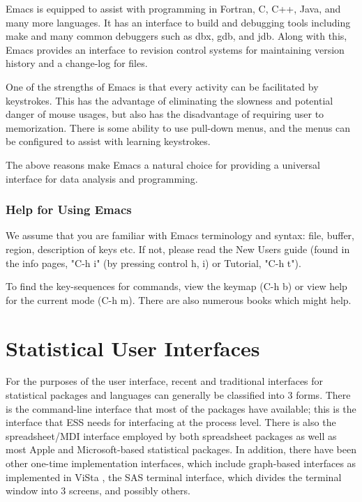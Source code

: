 \documentclass{article}
\begin{document}
Emacs is equipped to assist with programming in Fortran, C, C++, Java,
and many more languages.  It has an interface to build and debugging
tools including make and many common debuggers such as dbx, gdb, and
jdb.   Along with this, Emacs provides an interface to revision control
systems for maintaining version history and a change-log for files.

One of the strengths of Emacs is that every activity can be
facilitated by keystrokes.  This has the advantage of eliminating the
slowness and potential danger of mouse usages, but also has the
disadvantage of requiring user to memorization.  There is some
ability to use pull-down menus, and the menus can be configured to
assist with learning keystrokes.

The above reasons make Emacs a natural choice for providing a
universal interface for data analysis and programming.

\subsubsection{Help for Using Emacs}

We assume that you are familiar with Emacs terminology and syntax:
file, buffer, region, description of keys etc.  If not, please read
the New Users guide (found in the info pages, "C-h i" (by pressing
control h, i) or Tutorial, "C-h t").

To find the key-sequences for commands, view the keymap (C-h b) or
view help for the current mode (C-h m).   There are also numerous
books which might help.

\section{Statistical User Interfaces}
\label{sec:UI}

For the purposes of the user interface, recent and traditional
interfaces for statistical packages and languages can generally be
classified into 3 forms.  There is the command-line interface that
most of the packages have available; this is the interface that ESS
needs for interfacing at the process level.  There is also the
spreadsheet/MDI interface employed by both spreadsheet packages as
well as most Apple and Microsoft-based statistical packages.  In
addition, there have been other one-time implementation interfaces,
which include graph-based interfaces as implemented in ViSta
\citep{youn:lubi:1995}, the SAS terminal interface, which divides the
terminal window into 3 screens, and possibly others.
\end{document}
